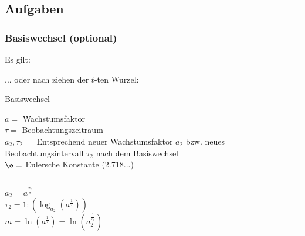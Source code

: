 \subsection*{Aufgaben}

\newpage
\subsubsection{Basiswechsel (optional)}
\begin{center}
  \end{center}

Es gilt:
\begin{center}
\end{center}

... oder nach ziehen der $t$-ten Wurzel:

\begin{gesetz}{Basiswechsel}{}

  \begin{center}\end{center}

 
  $a=$ Wachstumsfaktor\\
  $\tau=$ Beobachtungszeitraum\\
  $a_2, \tau_2=$ Entsprechend neuer Wachstumsfaktor $a_2$ bzw. neues
  Beobachtungsintervall $\tau_2$ nach dem Basiswechsel\\
  $\e=$ Eulersche Konstante (2.718...)\\
  \hrule
  \vspace{3mm}
\begin{center}\end{center}
  \vspace{3mm}
  $a_2 = a^{\frac{\tau_2}{\tau}}$\\
  \vspace{3mm}
  $\tau_2=1 : \left(\log_{a_2}\left(a^\frac1\tau\right)\right)$\\
  \vspace{3mm}
  $m=\ln\left(a^\frac1\tau\right) =  \ln\left(a_2^\frac1{\tau_2}\right)$\\
\end{gesetz}
\newpage

